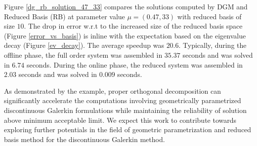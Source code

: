 \documentclass[graybox]{svmult}
\begin{document}
Figure \ref{dg_rb_solution_47_33} compares the solutions computed by DGM and Reduced Basis (RB) at parameter value $\mu = (0.47,33)$ with reduced basis of size $10$. The drop in error w.r.t to the increased size of the reduced basis space (Figure \ref{error_vs_basis}) is inline with the expectation based on the eigenvalue decay (Figure \ref{ev_decay}). The average speedup was $20.6$. Typically, during the offline phase, the full order system was assembled in $35.37$ seconds and was solved in $6.74$ seconds. During the online phase, the reduced system was assembled in $2.03$ seconds and was solved in $0.009$ seconds.

As demonstrated by the example, proper orthogonal decomposition can significantly accelerate the computations involving geometrically parametrized discontinuous Galerkin formulations while maintaining the reliability of solution above minimum acceptable limit. We expect this work to contribute towards exploring further potentials in the field of geometric parametrization and reduced basis method for the discontinuous Galerkin method.
\end{document}
